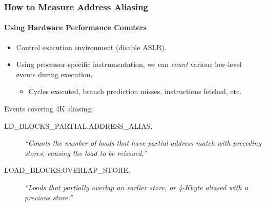 \documentclass{beamer}
\begin{document}
\begin{frame}
  \frametitle{How to Measure Address Aliasing}
  \framesubtitle{Using Hardware Performance Counters}

  \begin{itemize}
    \item Control execution environment (disable ASLR).
    \item Using processor-specific instrumentation, we can \emph{count} various low-level events during execution.
      \begin{itemize}
        \item Cycles executed, branch prediction misses, instructions fetched, etc.
      \end{itemize}
  \end{itemize}

  Events covering 4K aliasing:

  \begin{description}
    \item[{\small LD\_BLOCKS\_PARTIAL.ADDRESS\_ALIAS.}] 
    \emph{``Counts the number of loads that have partial address match with preceding stores, causing the load to be reissued.''} 
    \cite[B.3.4.4]{OptimizationManual}
  \end{description}
  \begin{description}
    \item[{\small LOAD\_BLOCKS.OVERLAP\_STORE.}] 
    \emph{``Loads that partially overlap an earlier store, or 4-Kbyte aliased with a previous store.''} 
    \cite[Table 19-17]{Volume3B}
  \end{description}

\end{frame}


\end{document}
